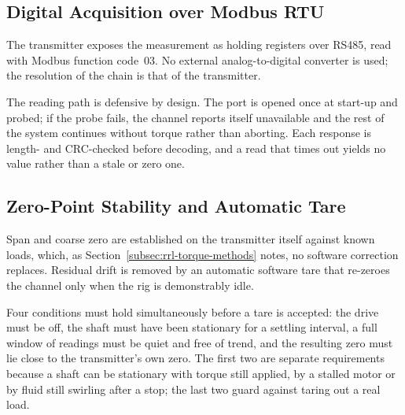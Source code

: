 
\subsection{Digital Acquisition over Modbus RTU}
\label{subsec:agit-torque-acq}

The transmitter exposes the measurement as holding registers over RS485, read with Modbus function code~03. No external analog-to-digital converter is used; the resolution of the chain is that of the transmitter.


The reading path is defensive by design. The port is opened once at start-up and probed; if the probe fails, the channel reports itself unavailable and the rest of the system continues without torque rather than aborting. Each response is length- and CRC-checked before decoding, and a read that times out yields no value rather than a stale or zero one.

\subsection{Zero-Point Stability and Automatic Tare}
\label{subsec:agit-tare}

Span and coarse zero are established on the transmitter itself against known loads, which, as Section~\ref{subsec:rrl-torque-methods} notes, no software correction replaces. Residual drift is removed by an automatic software tare that re-zeroes the channel only when the rig is demonstrably idle.

Four conditions must hold simultaneously before a tare is accepted: the drive must be off, the shaft must have been stationary for a settling interval, a full window of readings must be quiet and free of trend, and the resulting zero must lie close to the transmitter's own zero. The first two are separate requirements because a shaft can be stationary with torque still applied, by a stalled motor or by fluid still swirling after a stop; the last two guard against taring out a real load.

